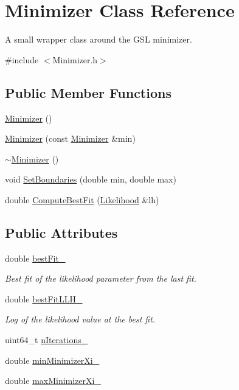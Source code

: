 \hypertarget{classMinimizer}{\section{Minimizer Class Reference}
\label{classMinimizer}
}


A small wrapper class around the G\-S\-L minimizer.  




{\ttfamily \#include $<$Minimizer.\-h$>$}

\subsection*{Public Member Functions}
\begin{DoxyCompactItemize}
\item 
\hyperlink{classMinimizer_a6954aac8325fa56845db3074b4a552d2}{Minimizer} ()
\item 
\hyperlink{classMinimizer_accc9c6d6c3724e4cd057ef4d00b45dfe}{Minimizer} (const \hyperlink{classMinimizer}{Minimizer} \&min)
\item 
\hyperlink{classMinimizer_aa0643eca7cdbc9c8550e3f28e8459ad2}{$\sim$\-Minimizer} ()
\item 
void \hyperlink{classMinimizer_af529621f077cc602c695d1e60e5adbba}{Set\-Boundaries} (double min, double max)
\item 
double \hyperlink{classMinimizer_a4419559871e702cd3da37d45081b1046}{Compute\-Best\-Fit} (\hyperlink{classLikelihood}{Likelihood} \&lh)
\end{DoxyCompactItemize}
\subsection*{Public Attributes}
\begin{DoxyCompactItemize}
\item 
double \hyperlink{classMinimizer_a375d2f66f20fdaedf828a536d473b9b9}{best\-Fit\-\_\-}
\begin{DoxyCompactList}\small\item\em Best fit of the likelihood parameter from the last fit. \end{DoxyCompactList}\item 
double \hyperlink{classMinimizer_ace3797e38fc23cf74bf05a3b1c3cdc36}{best\-Fit\-L\-L\-H\-\_\-}
\begin{DoxyCompactList}\small\item\em Log of the likelihood value at the best fit. \end{DoxyCompactList}\item 
uint64\-\_\-t \hyperlink{classMinimizer_ac2b79419b1d5230732bdf9c3f4ead23e}{n\-Iterations\-\_\-}
\item 
double \hyperlink{classMinimizer_a8628b992d7975decfd81d4f606072352}{min\-Minimizer\-Xi\-\_\-}
\item 
double \hyperlink{classMinimizer_adfbb5e367fbe3893a3bb97cfead25183}{max\-Minimizer\-Xi\-\_\-}
\end{DoxyCompactItemize}


